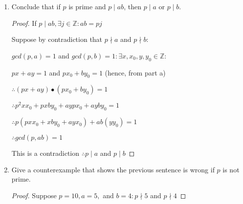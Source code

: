 \documentclass[11pt]{article}
\def\Z{\mathbb{Z}}
\begin{document}
\begin{enumerate}
\begin{enumerate}
\begin{proof}
$bc=ja$ \newline

We also know that if $gcd(a,b)=1, \exists x,y \in \Z :$ \newline

$ax+by=1$ \newline

Suppose we multiply both sides by $c :$ \newline

$axc+byc=c$ \newline

This can be rewritten as \newline

$axc+(aj)c=c$ (hence, $bc=aj$) \newline

$\therefore a(xc+jc)=c$ \newline

By letting $xc+jc=q, q \in \Z$ \newline

$a(q)=c \therefore a\mid c$
  \end{proof}
  \item Conclude that if $p$ is prime and $p \mid ab$, then $p \mid a$ or $p \mid b$.
   \begin{proof}
If $p\mid ab, \exists j \in \Z : ab=pj$ \newline

Suppose by contradiction that $p\nmid a$ and $p\nmid b :$\newline

$gcd(p,a)=1$ and $gcd(p,b)=1 : \exists x,x_0,y,y_0 \in \Z :$\newline

$px+ay=1$ and $px_0+by_0=1$ (hence, from part a)\newline

$\therefore (px+ay) \bullet (px_0+by_0)=1$\newline

$\therefore p^2xx_0+pxby_0+aypx_0+ayby_0=1$\newline

$\therefore p(pxx_0+xby_0+ayx_0)+ab(yy_0)=1$\newline

$\therefore gcd(p,ab)=1$\newline

This is a contradiction $\therefore p\mid a$ and $p\mid b$
  \end{proof}
  \item Give a counterexample that shows the previous sentence is wrong if $p$ is not prime.
   \begin{proof}
Suppose $p=10, a=5,$ and $b=4 : p\nmid 5$ and $p\nmid 4$\newline


\end{proof}
\end{enumerate}
\end{enumerate}
\end{document}
